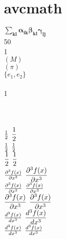 \newpage
\section*{avcmath}\indent

$\bm{\sum_{kl} \alpha_{ik}\beta_{kl}\gamma_{lj}}$ \\

50\eth \\

1\ird \\

\tr$(M)$ \\

\sgn$(\pi)$ \\

\spn$\{e_1,e_2\}$ \\

\bs \\

1\ird {}\ird \\

 \\

 \\

 \\

$\textstyle \frac {1}{2}$ $\displaystyle \frac {1}{2}$ \\

$\textstyle \tfrac{1}{2}$ $\displaystyle \tfrac{1}{2}$ \\

$\textstyle \dfrac{1}{2}$ $\displaystyle \dfrac{1}{2}$ \\

$\textstyle \frac {\partial^3f(x)}{\partial x^3}$ $\displaystyle \frac {\partial^3f(x)}{\partial x^3}$ \\

$\textstyle \tfrac{\partial^3f(x)}{\partial x^3}$ $\displaystyle \tfrac{\partial^3f(x)}{\partial x^3}$ \\

$\textstyle \dfrac{\partial^3f(x)}{\partial x^3}$ $\displaystyle \dfrac{\partial^3f(x)}{\partial x^3}$ \\

$\textstyle \frac {d ^3f(x)}{d x^3}$ $\displaystyle \frac {d ^3f(x)}{d x^3}$ \\

$\textstyle \tfrac{d ^3f(x)}{d x^3}$ $\displaystyle \tfrac{d ^3f(x)}{d x^3}$ \\

